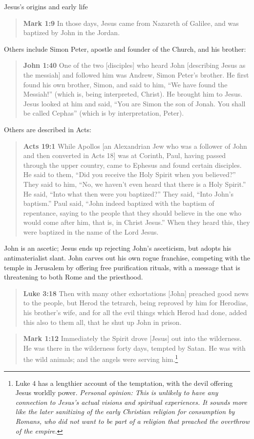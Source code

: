 \documentclass[8pt]{article}
\newcommand{\quotesize}{\large{}}
\newenvironment{quotetext}{\begin{quote}\quotesize}{\end{quote}}
\newcommand{\bible}[2]{\begin{quotetext}\textbf{#1} #2\end{quotetext}}
\newcommand{\gospelmark}[2]{\bible{Mark #1}{#2}}
\newcommand{\luke}[2]{\bible{Luke #1}{#2}}
\newcommand{\john}[2]{\bible{John #1}{#2}}
\newcommand{\personal}[1]{\emph{Personal opinion:\/ #1}}
\begin{document}
\begin{section}{Jesus's origins and early life}
\gospelmark{1:9}{In those days, Jesus came from Nazareth of Galilee, and was baptized by John in the Jordan.}

Others include Simon Peter, apostle and founder of the Church, and his brother:

\john{1:40}{One of the two [disciples] who heard John [describing 
Jesus as the messiah] and followed him was Andrew, Simon Peter’s
brother. He first found his own brother, Simon, and said to him, “We
have found the Messiah!” (which is, being interpreted, Christ). He
brought him to Jesus. Jesus looked at him and said, “You are Simon the
son of Jonah. You shall be called Cephas” (which is by interpretation,
Peter).}

Others are described in Acts:

\bible{Acts 19:1}{While Apollos [an Alexandrian Jew who was a follower of John and then converted in Acts 18] was at Corinth, Paul, having passed through the upper country, came to Ephesus and found certain disciples. He said to them, “Did you receive the Holy Spirit when you believed?”
They said to him, ``No, we haven’t even heard that there is a Holy Spirit.''
 He said, ``Into what then were you baptized?''
They said, ``Into John’s baptism.''
 Paul said, ``John indeed baptized with the baptism of repentance, saying to the people that they should believe in the one who would come after him, that is, in Christ Jesus.''
 When they heard this, they were baptized in the name of the Lord Jesus.}

John is an ascetic;
Jesus ends up rejecting John's asceticism, but adopts his antimaterialist slant.
John carves out his own rogue franchise, competing with the temple in Jerusalem by
offering free purification rituals, with a message that is threatening to both Rome and the priesthood.

\luke{3:18}{Then with many other exhortations [John] preached good news to the people, but Herod the tetrarch, being reproved by him for Herodias, his brother’s wife, and for all the evil things which Herod had done, added this also to them all, that he shut up John in prison.}

\gospelmark{1:12}{Immediately the Spirit drove [Jesus] out into the
wilderness. He was there in the wild\-erness forty days, tempted by
Satan. He was with the wild animals; and the angels were serving him.\footnote{Luke 4 has a lengthier account of
the temptation, with the devil offering Jesus worldly power. \personal{This is unlikely to have any connection to
Jesus's actual visions and spiritual experiences. It sounds more like the later sanitizing of the early
Christian religion for consumption by Romans, who did not want to be part of a religion that preached the overthrow
of the empire.}}}


\end{section}
\end{document}
